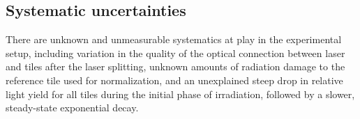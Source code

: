 



\subsection{Systematic uncertainties\label{sec:ana-unc}}

There are unknown and unmeasurable systematics at play in the experimental setup, including variation in the quality of the optical connection between laser and tiles after the laser splitting, unknown amounts of radiation damage to the reference tile used for normalization, and an unexplained steep drop in relative light yield for all tiles during the initial phase of irradiation, followed by a slower, steady-state exponential decay.


